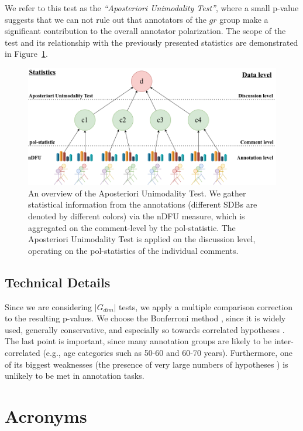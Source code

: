 \documentclass{article}
\newcommand{\sdbdim}{\textit{dim}}
\newcommand{\sdbgroup}{\textit{gr}}
\begin{document}
We refer to this test as the \textit{``Aposteriori Unimodality Test''}, where a small p-value suggests that we can not rule out that annotators of the $\sdbgroup$ group make a significant contribution to the overall annotator polarization. The scope of the test and its relationship with the previously presented statistics are demonstrated in Figure~\ref{fig::overview}.

\begin{figure}[t]
	\includegraphics[width=\linewidth]{overview.png}
	\caption{An overview of the Aposteriori Unimodality Test. We gather statistical information from the annotations (different \acp{SDB} are denoted by different colors) via the \ac{nDFU} measure, which is aggregated on the comment-level by the pol-statistic. The Aposteriori Unimodality Test is applied on the discussion level, operating on the pol-statistics of the individual comments.}
	\label{fig::overview}
\end{figure}


\subsection{Technical Details}
\label{ssec:methodology:details}

Since we are considering $\lvert G_{\sdbdim} \rvert$ tests, we apply a multiple comparison correction to the resulting p-values. We choose the Bonferroni method \parencite{Bland170}, since it is widely used, generally conservative, and especially so towards correlated hypotheses \parencite{ChenFengYi2017}. The last point is important, since many annotation groups are likely to be inter-correlated (e.g., age categories such as 50-60 and 60-70 years). Furthermore, one of its biggest weaknesses (the presence of very large numbers of hypotheses \parencite{ChenFengYi2017}) is unlikely to be met in annotation tasks.


\section{Acronyms}

\begin{acronym}[WWW]
\end{acronym}

\printbibliography
\end{document}
